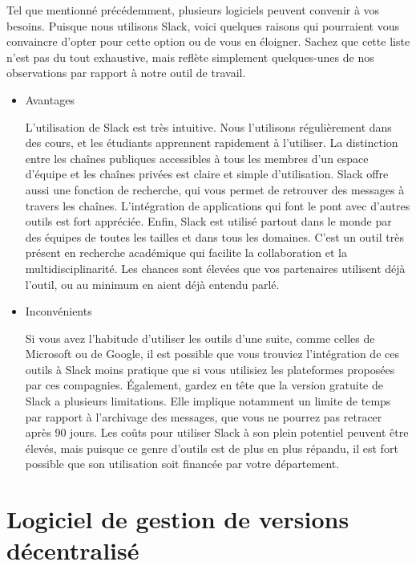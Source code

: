 \documentclass[
  letterpaper,
]{scrbook}
\begin{document}
Tel que mentionné précédemment, plusieurs logiciels peuvent convenir à
vos besoins. Puisque nous utilisons Slack, voici quelques raisons qui
pourraient vous convaincre d'opter pour cette option ou de vous en
éloigner. Sachez que cette liste n'est pas du tout exhaustive, mais
reflète simplement quelques-unes de nos observations par rapport à notre
outil de travail.

\begin{itemize}
\item
  Avantages

  L'utilisation de Slack est très intuitive. Nous l'utilisons
  régulièrement dans des cours, et les étudiants apprennent rapidement à
  l'utiliser. La distinction entre les chaînes publiques accessibles à
  tous les membres d'un espace d'équipe et les chaînes privées est
  claire et simple d'utilisation. Slack offre aussi une fonction de
  recherche, qui vous permet de retrouver des messages à travers les
  chaînes. L'intégration de applications qui font le pont avec d'autres
  outils est fort appréciée. Enfin, Slack est utilisé partout dans le
  monde par des équipes de toutes les tailles et dans tous les domaines.
  C'est un outil très présent en recherche académique qui facilite la
  collaboration et la multidisciplinarité. Les chances sont élevées que
  vos partenaires utilisent déjà l'outil, ou au minimum en aient déjà
  entendu parlé.
\item
  Inconvénients

  Si vous avez l'habitude d'utiliser les outils d'une suite, comme
  celles de Microsoft ou de Google, il est possible que vous trouviez
  l'intégration de ces outils à Slack moins pratique que si vous
  utilisiez les plateformes proposées par ces compagnies. Également,
  gardez en tête que la version gratuite de Slack a plusieurs
  limitations. Elle implique notamment un limite de temps par rapport à
  l'archivage des messages, que vous ne pourrez pas retracer après 90
  jours. Les coûts pour utiliser Slack à son plein potentiel peuvent
  être élevés, mais puisque ce genre d'outils est de plus en plus
  répandu, il est fort possible que son utilisation soit financée par
  votre département.
\end{itemize}

\hypertarget{logiciel-de-gestion-de-versions-duxe9centralisuxe9}{%
\section{Logiciel de gestion de versions
décentralisé}\label{logiciel-de-gestion-de-versions-duxe9centralisuxe9}}
\end{document}
